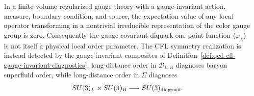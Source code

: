 \begin{proposition}
\label{prop:qcd-cfl-gauge-invariant-order}
In a finite-volume regularized gauge theory with a gauge-invariant action,
measure, boundary condition, and source, the expectation value of any local
operator transforming in a nontrivial irreducible representation of the
color gauge group is zero.  Consequently the gauge-covariant diquark
one-point function \(\langle\varphi_L\rangle\) is not itself a physical
local order parameter.  The CFL symmetry realization is instead detected by
the gauge-invariant composites of
Definition~\ref{def:qcd-cfl-gauge-invariant-diagnostics}: long-distance
order in \(\mathcal B_{L,R}\) diagnoses baryon superfluid order, while
long-distance order in \(\Sigma\) diagnoses
\[
  SU(3)_L\times SU(3)_R\longrightarrow SU(3)_{\rm diagonal}.
\]
\end{proposition}

